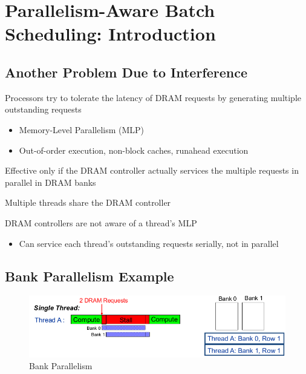 \documentclass[]{article}
\providecommand{\tightlist}{%
  \setlength{\itemsep}{0pt}\setlength{\parskip}{0pt}}
\begin{document}
\newpage

\hypertarget{parallelism-aware-batch-scheduling-introduction}{%
\section{Parallelism-Aware Batch Scheduling:
Introduction}\label{parallelism-aware-batch-scheduling-introduction}}

\hypertarget{another-problem-due-to-interference}{%
\subsection{Another Problem Due to
Interference}\label{another-problem-due-to-interference}}

Processors try to tolerate the latency of DRAM requests by generating
multiple outstanding requests

\begin{itemize}
\tightlist
\item
  Memory-Level Parallelism (MLP)
\item
  Out-of-order execution, non-block caches, runahead execution
\end{itemize}

Effective only if the DRAM controller actually services the multiple
requests in parallel in DRAM banks

Multiple threads share the DRAM controller

DRAM controllers are not aware of a thread's MLP

\begin{itemize}
\tightlist
\item
  Can service each thread's outstanding requests serially, not in
  parallel
\end{itemize}

\hypertarget{bank-parallelism-example}{%
\subsection{Bank Parallelism Example}\label{bank-parallelism-example}}

\begin{figure}
\centering
\includegraphics{./tex2pdf.-ee748c56ff17e1e1/ada8ab1ceade888491eb9d14db3d6690d9805ce3.png}
\caption{Bank Parallelism}
\end{figure}
\end{document}
